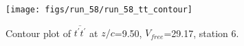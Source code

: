 \begin{figure}[H]
\centering
\texttt{[image: figs/run\_58/run\_58\_tt\_contour]}
\caption{Contour plot of $\overline{t^\prime t^\prime}$ at $z/c$=9.50, $V_{free}$=29.17, station 6.}
\end{figure}


